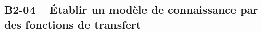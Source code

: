 \subsection{B2-04 -- Établir un modèle de connaissance par des fonctions de transfert}

\renewcommand{\repExo}{../../ExercicesCompetences/B2_ProposerModele/B2_04_ModeleConnaissance}


\renewcommand{\td}{51_MCC}
\graphicspath{{\repStyle/png/}{\repExo/\td/images/}}

